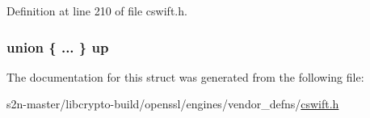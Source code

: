Definition at line 210 of file cswift.\+h.

\subsubsection[{\texorpdfstring{up}{up}}]{\setlength{\rightskip}{0pt plus 5cm}union \{ ... \}   up}\hypertarget{struct___s_w___p_a_r_a_m_ac589df1364a0aef9cc3236c8e9c1ec68}{}\label{struct___s_w___p_a_r_a_m_ac589df1364a0aef9cc3236c8e9c1ec68}


The documentation for this struct was generated from the following file\+:\begin{DoxyCompactItemize}
\item 
s2n-\/master/libcrypto-\/build/openssl/engines/vendor\+\_\+defns/\hyperlink{cswift_8h}{cswift.\+h}\end{DoxyCompactItemize}
